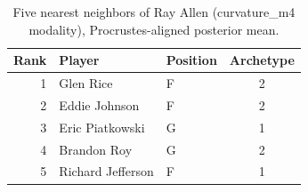 \begin{table}[htbp]
  \centering\small
  \begin{tabular}{rllc}
    \toprule
    Rank & Player & Position & Archetype \\
    \midrule
    1 & Glen Rice & F & 2 \\
    2 & Eddie Johnson & F & 2 \\
    3 & Eric Piatkowski & G & 1 \\
    4 & Brandon Roy & G & 2 \\
    5 & Richard Jefferson & F & 1 \\
    \bottomrule
  \end{tabular}
  \caption{Five nearest neighbors of Ray Allen (curvature_m4 modality), Procrustes-aligned posterior mean.}
  \label{tab:Ray_Allen_neighbors_curvature_m4}
\end{table}

